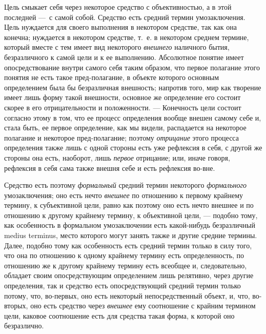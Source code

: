 \documentclass[twoside]{article}
\begin{document}
{{{{Цель смыкает себя через некоторое средство с объективностью, а
в этой последней —~с самой собой. Средство есть средний
термин умозаключения. Цель нуждается для своего выполнения в некотором
средстве, так как она конечна; нуждается в некотором средстве, т.~е. в
некотором среднем термине, который вместе с тем имеет вид некоторого
{\em внешнего} наличного
бытия, безразличного к самой цели и к ее выполнению. Абсолютное понятие
имеет опосредствование внутри самого себя таким образом, что первое
полагание этого понятия не есть такое пред-полагание, в объекте
которого основным определением была бы безразличная внешность; напротив
того, мир как творение имеет лишь форму такой внешности, основное же
определение его состоит скорее в его отрицательности и положенности. —
Конечность цели состоит согласно этому в том, что ее процесс
определения вообще внешен самому себе и, стала быть, ее первое определение,
как мы видели, распадается на некоторое полагание и некоторое
пред-полагание; поэтому {\em отрицание}
этого процесса определения также лишь с одной стороны есть
уже рефлексия в себя, с другой же стороны она есть, наоборот, лишь
{\em первое} отрицание;
или, иначе говоря, рефлексия в себя сама также внешня себе и есть рефлексия
во-вне.

Средство есть поэтому
{\em формальный} средний
термин некоторого {\em формального}
умозаключения; оно есть нечто
{\em внешнее} по
отношению к первому крайнему термину, к субъективной цели, равно как
поэтому оно есть нечто внешнее и по отношению к другому крайнему термину, к
объективной цели, — подобно тому, как особенность в
формальном умозаключении есть какой-нибудь безразличный medius terminus,
место которого могут занять также и другие средние термины.
Далее, подобно тому как особенность есть средний термин только в силу того,
что она по отношению к одному крайнему термину есть определенность, по
отношению же к другому крайнему термину есть всеобщее и, следовательно,
обладает своим опосредствующим определением лишь релятивно, через другие
определения, так и средство есть опосредствующий средний
термин только потому, что, во-первых, оно есть некоторый непосредственный
объект, и, что, во-вторых, оно есть средство через
{\em внешнее} ему
соотношение с крайним термином цели, каковое соотношение есть для средства
такая форма, к которой оно безразлично.

}}}}
\end{document}
